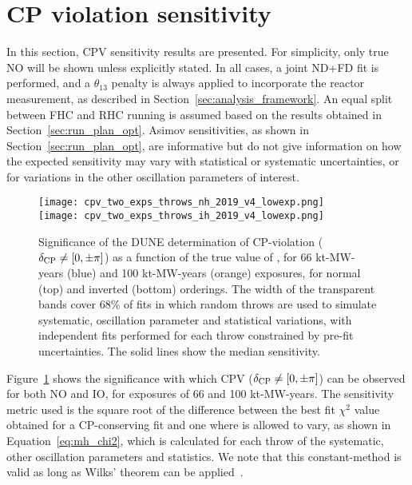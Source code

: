 \FloatBarrier
\section{CP violation sensitivity}
\label{sec:cp_sens}

In this section, CPV sensitivity results are presented. For simplicity, only true NO will be shown unless explicitly stated. In all cases, a joint ND+FD fit is performed, and a $\theta_{13}$ penalty is always applied to incorporate the reactor measurement, as described in Section~\ref{sec:analysis_framework}. An equal split between FHC and RHC running is assumed based on the results obtained in Section~\ref{sec:run_plan_opt}. Asimov sensitivities, as shown in Section~\ref{sec:run_plan_opt}, are informative but do not give information on how the expected sensitivity may vary with statistical or systematic uncertainties, or for variations in the other oscillation parameters of interest.

\begin{figure}[htbp]
  \centering
  \texttt{[image: cpv\_two\_exps\_throws\_nh\_2019\_v4\_lowexp.png]}\\
  \texttt{[image: cpv\_two\_exps\_throws\_ih\_2019\_v4\_lowexp.png]}
  \caption{Significance of the DUNE determination of CP-violation ($\delta_{\rm CP} \neq [0,\pm\pi]$) as a function of the true value of \deltacp, for 66 kt-MW-years (blue) and 100 kt-MW-years (orange) exposures, for normal (top) and inverted (bottom) orderings. The width of the transparent bands cover 68\% of fits in which random throws are used to simulate systematic, oscillation parameter and statistical variations, with independent fits performed for each throw constrained by pre-fit uncertainties. The solid lines show the median sensitivity.}
  \label{fig:cpv_bands}
\end{figure}
Figure~\ref{fig:cpv_bands} shows the significance with which CPV ($\delta_{\rm CP} \neq [0, \pm\pi]$) can be observed for both NO and IO, for exposures of 66 and 100 kt-MW-years.  The sensitivity metric used is the square root of the difference between the best fit $\chi^{2}$ value obtained for a CP-conserving fit and one where \deltacp is allowed to vary, as shown in Equation~\ref{eq:mh_chi2}, which is calculated for each throw of the systematic, other oscillation parameters and statistics. We note that this constant-\dchisq method is valid as long as Wilks' theorem can be applied~\cite{wilks}.

